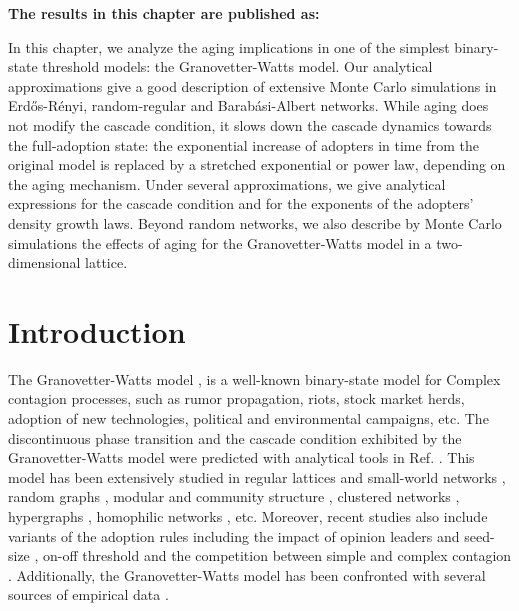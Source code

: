 \vspace{-1.5cm}
\small
\textbf{The results in this chapter are published as:}
\vspace{0.05 cm}

\normalsize
\vspace{0.5 cm}

In this chapter, we analyze the aging implications in one of the simplest binary-state threshold models: the Granovetter-Watts model. Our analytical approximations give a good description of extensive Monte Carlo simulations in Erd\H{o}s-R\'enyi, random-regular and Barab\'asi-Albert networks. While aging does not modify the cascade condition, it slows down the cascade dynamics towards the full-adoption state: the exponential increase of adopters in time from the original model is replaced by a stretched exponential or power law, depending on the aging mechanism. Under several approximations, we give analytical expressions for the cascade condition and for the exponents of the adopters' density growth laws. Beyond random networks, we also describe by Monte Carlo simulations the effects of aging for the Granovetter-Watts model in a two-dimensional lattice.

\section{\label{sec:Introduction_Threshold} Introduction}

The Granovetter-Watts model \cite{granovetter-1978,watts-2002}, is a well-known binary-state model for Complex contagion processes, such as rumor propagation,  riots, stock market herds, adoption of new technologies, political and environmental campaigns, etc. The discontinuous phase transition and the cascade condition exhibited by the Granovetter-Watts model were predicted with analytical tools in Ref. \cite{watts-2002}. This model has been extensively studied in regular lattices and small-world networks \cite{centola-2007}, random graphs \cite{gleeson-2007},  modular and community structure \cite{gleeson-2008}, clustered networks \cite{hackett-2011,hackett-2013}, hypergraphs \cite{de-arruda-2020}, homophilic networks \cite{diaz-diaz-2022}, etc. Moreover, recent studies also include variants of the adoption rules including
the impact of opinion leaders \cite{liu-2018} and seed-size \cite{singh-2013}, on-off threshold \cite{dodds-2013} and the competition between simple and complex contagion \cite{czaplicka-2016,min-2018,min-2018-dual,diaz-diaz-2022,min2023threshold}. Additionally, the Granovetter-Watts model has been confronted with several sources of empirical data \cite{centola-2010,karimi-2013,karsai-2014,rosenthal-2015,karsai-2016,mnsted-2017,unicomb-2018,guilbeault-2021}.


